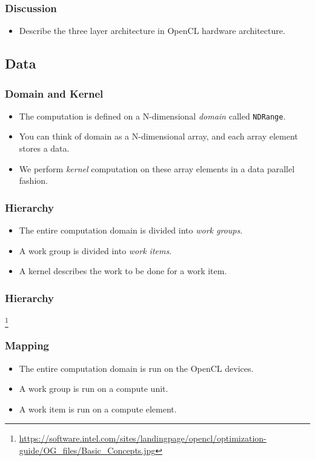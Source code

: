 \documentclass{beamer}
\begin{document}
\begin{frame}
  \frametitle{Discussion}
  \begin{itemize}
  \item Describe the three layer architecture in OpenCL hardware
    architecture.
  \end{itemize}
\end{frame}

\subsection{Data}

\begin{frame}
  \frametitle{Domain and Kernel}
  \begin{itemize}
  \item The computation is defined on a N-dimensional {\em domain}
    called {\tt NDRange}.
  \item You can think of domain as a N-dimensional array, and each
    array element stores a data.
  \item We perform {\em kernel} computation on these array elements in
    a data parallel fashion.
  \end{itemize}
\end{frame}

\begin{frame}
  \frametitle{Hierarchy}
  \begin{itemize}
  \item The entire computation domain is divided into {\em work groups}.
  \item A work group is divided into {\em work items}.
  \item A kernel describes the work to be done for a work item.
  \end{itemize}
\end{frame}

\begin{frame}
  \frametitle{Hierarchy}
  \centerline{}\footnote{\url{https://software.intel.com/sites/landingpage/opencl/optimization-guide/OG_files/Basic_Concepts.jpg}}
\end{frame}


\begin{frame}
  \frametitle{Mapping}
  \begin{itemize}
  \item The entire computation domain is run on the OpenCL devices.
  \item A work group is run on a compute unit.
  \item A work item is run on a compute element.
  \end{itemize}
\end{frame}
\end{document}
